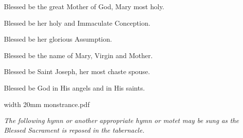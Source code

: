 Blessed be the great Mother of God, Mary most holy.

Blessed be her holy and Immaculate Conception.

Blessed be her glorious Assumption.

Blessed be the name of Mary, Virgin and Mother.

Blessed be Saint Joseph, her most chaste spouse.

Blessed be God in His angels and in His saints.

\bigskip

\pdfximage width 20mm {monstrance.pdf}

\centerline{\pdfrefximage \pdflastximage}



\goodbreak
\bigskip
\eject


\medskip

{\noindent \it The following hymn or another appropriate hymn or motet may be sung as the Blessed Sacrament is reposed in the tabernacle.}

\medskip



